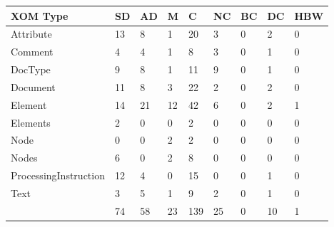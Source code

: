 \begin{tabular}{|l|l|l|l|l|l|l|l|l|}\hline
XOM Type & SD & AD & M & C & NC & BC & DC & HBW\\\hline\hline
Attribute & 13 & 8 & 1 & 20 & 3 & 0 & 2 & 0\\\hline\hline
Comment & 4 & 4 & 1 & 8 & 3 & 0 & 1 & 0\\\hline\hline
DocType & 9 & 8 & 1 & 11 & 9 & 0 & 1 & 0\\\hline\hline
Document & 11 & 8 & 3 & 22 & 2 & 0 & 2 & 0\\\hline\hline
Element & 14 & 21 & 12 & 42 & 6 & 0 & 2 & 1\\\hline\hline
Elements & 2 & 0 & 0 & 2 & 0 & 0 & 0 & 0\\\hline\hline
Node & 0 & 0 & 2 & 2 & 0 & 0 & 0 & 0\\\hline\hline
Nodes & 6 & 0 & 2 & 8 & 0 & 0 & 0 & 0\\\hline\hline
ProcessingInstruction & 12 & 4 & 0 & 15 & 0 & 0 & 1 & 0\\\hline\hline
Text & 3 & 5 & 1 & 9 & 2 & 0 & 1 & 0\\\hline\hline
 & 74 & 58 & 23 & 139 & 25 & 0 & 10 & 1\\\hline
\end{tabular}
